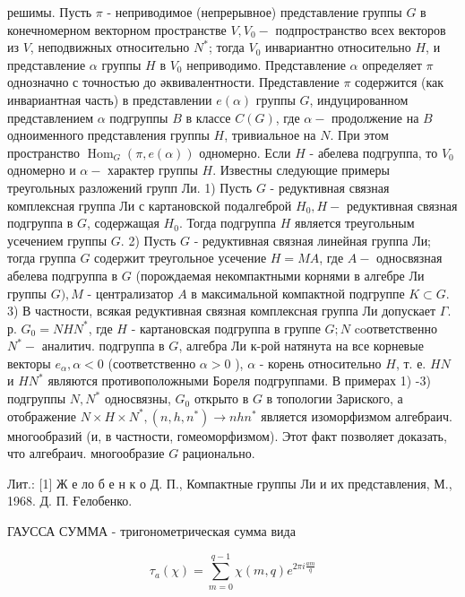 \documentclass[10pt]{article}
\begin{document}
решимы. Пусть $\pi$ - неприводимое (непрерывное) представление группы $G$ в конечномерном векторном пространстве $V, V_{0}-$ подпространство всех векторов из $V$, неподвижных относительно $N^{*}$; тогда $V_{0}$ инвариантно относительно $H$, и представление $\alpha$ группы $H$ в $V_{0}$ неприводимо. Представление $\alpha$ определяет $\pi$ однозначно с точностью до әквивалентности. Представление $\pi$ содержится (как инвариантная часть) в представлении $e(\alpha)$ группы $G$, индуцированном представлением $\alpha$ подгруппы $B$ в классе $C(G)$, где $\alpha-$ продолжение на $B$ одноименного представления группы $H$, тривиальное на $N$. При этом пространство $\operatorname{Hom}_{G}(\pi, e(\alpha))$ одномерно. Если $H$ - абелева подгруппа, то $V_{0}$ одномерно и $\alpha-$ характер группы $H$. Известны следующие примеры треугольных разложений групп Ли. 1) Пусть $G$ - редуктивная связная комплексная группа Ли с картановской подалгеброй $H_{0}, H-$ редуктивная связная подгруппа в $G$, содержащая $H_{0}$. Тогда подгруппа $H$ является треугольным усечением группы $G$. 2) Пусть $G$ - редуктивная связная линейная группа Ли; тогда группа $G$ содержит треугольное усечение $H=M A$, где $A-$ односвязная абелева подгруппа в $G$ (порождаемая некомпактными корнями в алгебре Ли группы $G), M$ - централизатор $A$ в максимальной компактной подгруппе $K \subset G$. 3) В частности, всякая редуктивная связная комплексная группа Ли допускает $\Gamma$. р. $G_{0}=N H N^{*}$, где $H$ - картановская подгруппа в группе $G ; N$ coответственно $N^{*}-$ аналитич. подгруппа в $G$, алгебра Ли к-рой натянута на все корневые векторы $e_{\alpha}, \alpha<0$ (соответственно $\alpha>0$ ), $\alpha$ - корень относительно $H$, т. е. $H N$ и $H N^{*}$ являются противоположными Бореля подгруппами. В примерах 1) -3) подгруппы $N, N^{*}$ односвязны, $G_{0}$ открыто в $G$ в топологии Зариского, а отображение $N \times H \times N^{*},\left(n, h, n^{*}\right) \rightarrow n h n^{*}$ является изоморфизмом алгебраич. многообразий (и, в частности, гомеоморфизмом). Этот факт позволяет доказать, что алгебраич. многообразие $G$ рационально.



Лит.: [1] Ж е ло б е н к о Д. П., Компактные группы Ли и их представления, М., 1968. Д. П. Ғелобенко.



ГАУССА СУММА - тригонометрическая сумма вида



\[

\tau_{a}(\chi)=\sum_{m=0}^{q-1} \chi(m, q) e^{2 \pi i \frac{a m}{q}}

\]
\end{document}
